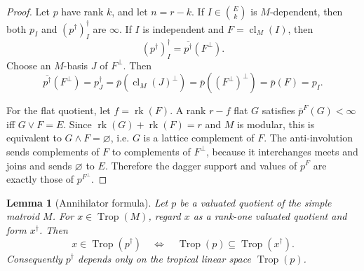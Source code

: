 \documentclass[12pt]{article}
\newtheorem{lemma}[theorem]{Lemma}
\theoremstyle{definition}
\newcommand{\Trop}{\operatorname{Trop}}
\newcommand{\rk}{\operatorname{rk}}
\newcommand{\cl}{\operatorname{cl}}
\newcommand{\binomE}[1]{\binom{E}{#1}}
\begin{document}
\begin{proof}
Let \(p\) have rank \(k\), and let \(n=r-k\).  If \(I\in\binomE k\) is \(M\)-dependent, then both \(p_I\) and \((p^\dagger)^\dagger_I\) are \(\infty\).  If \(I\) is independent and \(F=\cl_M(I)\), then
\[
(p^\dagger)^\dagger_I=\overline{p^\dagger}(F^\perp).
\]
Choose an \(M\)-basis \(J\) of \(F^\perp\).  Then
\[
\overline{p^\dagger}(F^\perp)=p^\dagger_J
=\bar p(\cl_M(J)^\perp)=\bar p((F^\perp)^\perp)=\bar p(F)=p_I.
\]

For the flat quotient, let \(f=\rk(F)\).  A rank \(r-f\) flat \(G\) satisfies \(\bar p^F(G)<\infty\) iff \(G\vee F=E\).  Since \(\rk(G)+\rk(F)=r\) and \(M\) is modular, this is equivalent to \(G\wedge F=\varnothing\), i.e. \(G\) is a lattice complement of \(F\).  The anti-involution sends complements of \(F\) to complements of \(F^\perp\), because it interchanges meets and joins and sends \(\varnothing\) to \(E\).  Therefore the dagger support and values of \(p^F\) are exactly those of \(p^{F^\perp}\).
\end{proof}

\begin{lemma}[Annihilator formula]\label{lem:annihilator}
Let \(p\) be a valuated quotient of the simple matroid \(M\).  For \(x\in\Trop(M)\), regard \(x\) as a rank-one valuated quotient and form \(x^\dagger\).  Then
\[
x\in \Trop(p^\dagger)
\quad\Longleftrightarrow\quad
\Trop(p)\subseteq \Trop(x^\dagger).
\tag{\(*\)}
\]
Consequently \(p^\dagger\) depends only on the tropical linear space \(\Trop(p)\).
\end{lemma}
\end{document}
